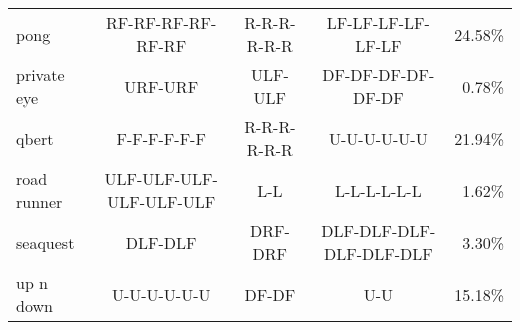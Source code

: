 \begin{table}[h!]
{\begin{tabular}{l|ccc|r}
        pong & RF-RF-RF-RF-RF-RF & R-R-R-R-R-R & LF-LF-LF-LF-LF-LF & 24.58\% \\
        private eye & URF-URF & ULF-ULF & DF-DF-DF-DF-DF-DF & 0.78\% \\
        qbert & F-F-F-F-F-F & R-R-R-R-R-R & U-U-U-U-U-U & 21.94\% \\
        road runner & ULF-ULF-ULF-ULF-ULF-ULF & L-L & L-L-L-L-L-L & 1.62\% \\
        seaquest & DLF-DLF & DRF-DRF & DLF-DLF-DLF-DLF-DLF-DLF & 3.30\% \\
        up n down & U-U-U-U-U-U & DF-DF & U-U & 15.18\% \\
        \bottomrule
    \end{tabular}
    }
    \label{tab:option-top3-op6}
\end{table}




